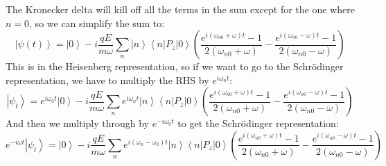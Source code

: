\documentclass[12pt]{article}
\begin{document}
The Kronecker delta will kill off all the terms in the sum except for the one where $n=0$, so we can simplify the sum to:
\begin{equation}
\left|\psi(t)\right\rangle = \left|0\right\rangle -i \frac{q E}{m \omega} \sum_{n} \left|n\right\rangle \left\langle n\left|P_{z}\right|0\right\rangle \left( \frac{e^{i (\omega _{n0} + \omega) t} - 1}{2 (\omega _{n0} + \omega)} - \frac{e^{i (\omega _{n0} - \omega) t} - 1}{2 (\omega _{n0} - \omega)} \right)
\end{equation}
This is in the Heisenberg representation, so if we want to go to the Schrödinger representation, we have to multiply the RHS by $e^{i\omega_n t}$:
\begin{equation}
\left|\psi_t\right\rangle = e^{i\omega_{0} t} \left|0\right\rangle -i \frac{q E}{m \omega} \sum_{n} e^{i\omega_n t} \left|n\right\rangle \left\langle n\left|P_{z}\right|0\right\rangle \left( \frac{e^{i (\omega _{n0} + \omega) t} - 1}{2 (\omega _{n0} + \omega)} - \frac{e^{i (\omega _{n0} - \omega) t} - 1}{2 (\omega _{n0} - \omega)} \right)
\end{equation}
And then we multiply through by $e^{-i\omega_0 t}$ to get the Schrödinger representation:
\begin{equation}
e^{-i\omega t}\left|\psi_t\right\rangle = \left|0\right\rangle -i \frac{q E}{m \omega} \sum_{n} e^{i(\omega_n - \omega_0) t} \left|n\right\rangle \left\langle n\left|P_{z}\right|0\right\rangle \left( \frac{e^{i (\omega _{n0} + \omega) t} - 1}{2 (\omega _{n0} + \omega)} - \frac{e^{i (\omega _{n0} - \omega) t} - 1}{2 (\omega _{n0} - \omega)} \right)
\end{equation}
\end{document}
